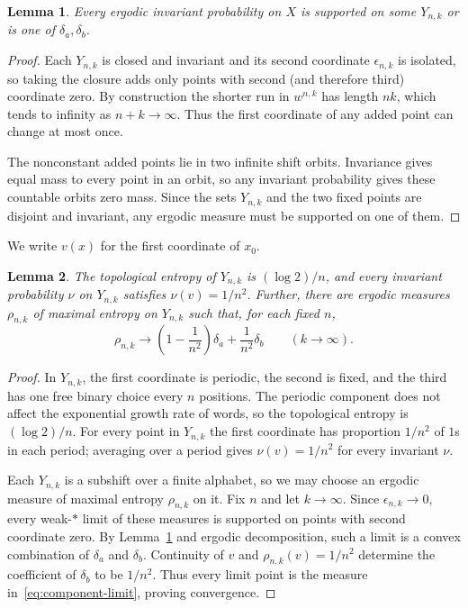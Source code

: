 \documentclass[10pt]{amsart}
\numberwithin{equation}{section}
\newtheorem{lemma}{Lemma}[section]
\begin{document}
\begin{lemma}\label{lem:example-measures}
Every ergodic invariant probability on $X$ is supported on some
$Y_{n,k}$ or is one of $\delta_a,\delta_b$.
\end{lemma}

\begin{proof} Each $Y_{n,k}$ is closed and invariant and its second coordinate $\epsilon_{n,k}$
is isolated, so taking the closure adds only points with second (and therefore third)
coordinate zero. By construction the shorter
run in $w^{n,k}$ has length $nk$, which tends to infinity as
$n+k\to\infty$. Thus the first coordinate of any added point can
change at most once.

The nonconstant added points lie in two infinite shift orbits.
Invariance gives equal mass to every point in an orbit, so any
invariant probability gives these countable orbits zero mass.
Since the sets $Y_{n,k}$ and the two fixed points are disjoint and
invariant, any ergodic measure must be supported on one of them.
\end{proof}

We write $v(x)$ for the first coordinate of $x_0$.

\begin{lemma}\label{lem:components}
The topological entropy of $Y_{n,k}$ is $(\log2)/n$, and every
invariant probability $\nu$ on $Y_{n,k}$ satisfies $\nu(v)=1/n^2$.
Further, there are ergodic measures $\rho_{n,k}$ of maximal entropy on
$Y_{n,k}$ such that, for each fixed $n$,
\begin{equation}\label{eq:component-limit}
 \rho_{n,k}\longrightarrow
 \left(1-\frac{1}{n^2}\right)\delta_a+\frac{1}{n^2}\delta_b
 \qquad(k\to\infty).
\end{equation}
\end{lemma}

\begin{proof}
In $Y_{n,k}$, the first coordinate is periodic, the second is fixed,
and the third has one free binary choice every $n$ positions.
The periodic component does not affect the exponential growth
rate of words, so the topological entropy is $(\log2)/n$.
For every point in $Y_{n,k}$ the first coordinate has proportion $1/n^2$ of $1$s in each period;
averaging over a period gives $\nu(v)=1/n^2$ for every invariant $\nu$.

Each $Y_{n,k}$ is a subshift over a finite alphabet, so we may choose
an ergodic measure of maximal entropy $\rho_{n,k}$ on it.
Fix $n$ and let $k\to\infty$. Since $\epsilon_{n,k}\to0$, every
weak\nobreakdash-$*$ limit of these measures is supported on points
with second coordinate zero. By Lemma~\ref{lem:example-measures}
and ergodic decomposition, such a limit is a convex combination of
$\delta_a$ and $\delta_b$. Continuity of $v$ and
$\rho_{n,k}(v)=1/n^2$ determine the coefficient of $\delta_b$ to be
$1/n^2$. Thus every limit point is the measure
in~\eqref{eq:component-limit}, proving convergence.
\end{proof}
\end{document}
